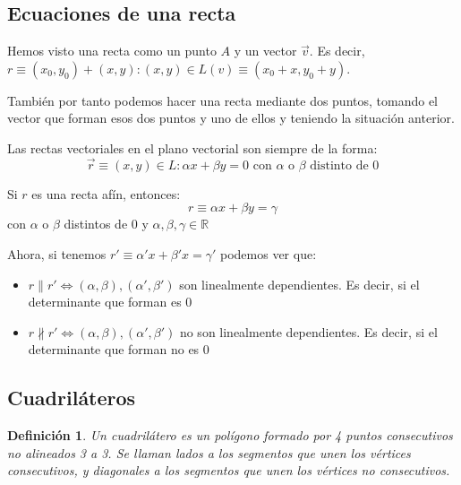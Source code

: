 \documentclass[11pt, a4paper]{article}
\newif\IfInSansMode
\newcommand{\R}{\mathbb{R}}
\renewcommand{\vec}{\overrightarrow}
\theoremstyle{theorem-style}
\theoremstyle{definition-style}
\newtheorem{ndef}{Definición}[section]
\theoremstyle{remark-style}
\theoremstyle{example-style}
\begin{document}
\subsection{Ecuaciones de una recta}
Hemos visto una recta como un punto $A$ y un vector $\vec{v}$. Es decir, $r \equiv (x_0,y_0) +(x,y) : (x,y) \in L(v) \equiv (x_0+x,y_0+y) $.

También por tanto podemos hacer una recta mediante dos puntos, tomando el vector que forman esos dos puntos y uno de ellos y teniendo la situación anterior.

Las rectas vectoriales en el plano vectorial son siempre de la forma:
\[
  \vec{r} \equiv (x,y) \in L : \alpha x + \beta y = 0 \text{  con $\alpha$ o $\beta$ distinto de 0}
\]

Si $r$ es una recta afín, entonces:
\[
  r \equiv \alpha x + \beta y = \gamma
\] con $\alpha$ o $\beta$ distintos de $0$ y $\alpha,\beta,\gamma \in \R$

Ahora, si tenemos $r'\equiv \alpha' x + \beta' x = \gamma '$ podemos ver que:
\begin{itemize}
\item $r \parallel r' \iff (\alpha,\beta), (\alpha',\beta') $ son linealmente dependientes. Es decir, si el determinante que forman es $0$

\item $r \nparallel r'\iff (\alpha,\beta), (\alpha',\beta') $ no son linealmente dependientes. Es decir, si el determinante que forman no es $0$
\end{itemize}

\subsection{Cuadriláteros}

\begin{ndef}
  Un cuadrilátero es un polígono formado por 4 puntos consecutivos no alineados 3 a 3. Se llaman \textit{lados} a los segmentos que unen los vértices consecutivos, y \textit{diagonales} a los segmentos que unen los vértices no consecutivos.
\end{ndef}
\end{document}
